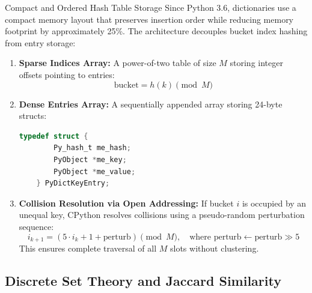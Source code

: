 \begin{theorembox}{Compact and Ordered Hash Table Storage}
 
Since Python 3.6, dictionaries use a compact memory layout that preserves insertion order while reducing memory footprint by approximately 25\%.
The architecture decouples bucket index hashing from entry storage:
\begin{enumerate}
    \item \textbf{Sparse Indices Array:} A power-of-two table of size $M$ storing integer offsets pointing to entries:
    \begin{equation}
    \text{bucket} = h(k) \pmod M
    \end{equation}
    \item \textbf{Dense Entries Array:} A sequentially appended array storing 24-byte structs:
    \begin{lstlisting}[language=C]
    typedef struct {
        Py_hash_t me_hash;
        PyObject *me_key;
        PyObject *me_value;
    } PyDictKeyEntry;
    \end{lstlisting}
    \item \textbf{Collision Resolution via Open Addressing:} If bucket $i$ is occupied by an unequal key, CPython resolves collisions using a pseudo-random perturbation sequence:
    \begin{equation}
    i_{k+1} = (5 \cdot i_k + 1 + \text{perturb}) \pmod M, \quad \text{where } \text{perturb} \leftarrow \text{perturb} \gg 5
    \end{equation}
    This ensures complete traversal of all $M$ slots without clustering.
\end{enumerate}
\end{theorembox}

\subsection{Discrete Set Theory and Jaccard Similarity}

